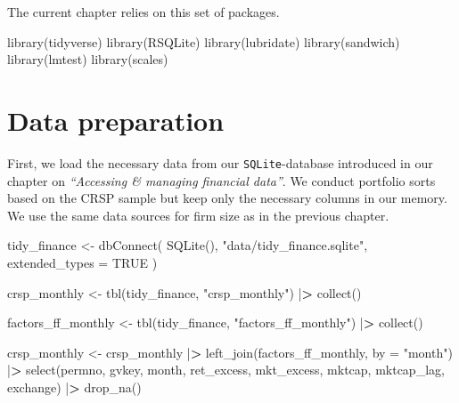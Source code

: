 \documentclass[
]{book}
\newenvironment{Shaded}{\begin{snugshade}}{\end{snugshade}}
\newcommand{\AttributeTok}[1]{\textcolor[rgb]{0.61,0.61,0.61}{#1}}
\newcommand{\ConstantTok}[1]{\textcolor[rgb]{0,0,0}{#1}}
\newcommand{\ErrorTok}[1]{\textcolor[rgb]{0.14,0.14,0.14}{\textbf{#1}}}
\newcommand{\FunctionTok}[1]{\textcolor[rgb]{0,0,0}{#1}}
\newcommand{\NormalTok}[1]{#1}
\newcommand{\OtherTok}[1]{\textcolor[rgb]{0.37,0.37,0.37}{#1}}
\newcommand{\SpecialCharTok}[1]{\textcolor[rgb]{0,0,0}{#1}}
\newcommand{\StringTok}[1]{\textcolor[rgb]{0.5,0.5,0.5}{#1}}
\begin{document}
The current chapter relies on this set of packages.

\begin{Shaded}
\begin{Highlighting}[]
\FunctionTok{library}\NormalTok{(tidyverse)}
\FunctionTok{library}\NormalTok{(RSQLite)}
\FunctionTok{library}\NormalTok{(lubridate)}
\FunctionTok{library}\NormalTok{(sandwich)}
\FunctionTok{library}\NormalTok{(lmtest)}
\FunctionTok{library}\NormalTok{(scales)}
\end{Highlighting}
\end{Shaded}

\hypertarget{data-preparation-2}{%
\section{Data preparation}\label{data-preparation-2}}

First, we load the necessary data from our \texttt{SQLite}-database introduced in our chapter on \emph{``Accessing \& managing financial data''}. We conduct portfolio sorts based on the CRSP sample but keep only the necessary columns in our memory. We use the same data sources for firm size as in the previous chapter.

\begin{Shaded}
\begin{Highlighting}[]
\NormalTok{tidy\_finance }\OtherTok{\textless{}{-}} \FunctionTok{dbConnect}\NormalTok{(}
  \FunctionTok{SQLite}\NormalTok{(), }\StringTok{"data/tidy\_finance.sqlite"}\NormalTok{, }\AttributeTok{extended\_types =} \ConstantTok{TRUE}
\NormalTok{)}

\NormalTok{crsp\_monthly }\OtherTok{\textless{}{-}} \FunctionTok{tbl}\NormalTok{(tidy\_finance, }\StringTok{"crsp\_monthly"}\NormalTok{) }\SpecialCharTok{|}\ErrorTok{\textgreater{}}
  \FunctionTok{collect}\NormalTok{()}

\NormalTok{factors\_ff\_monthly }\OtherTok{\textless{}{-}} \FunctionTok{tbl}\NormalTok{(tidy\_finance, }\StringTok{"factors\_ff\_monthly"}\NormalTok{) }\SpecialCharTok{|}\ErrorTok{\textgreater{}}
  \FunctionTok{collect}\NormalTok{()}

\NormalTok{crsp\_monthly }\OtherTok{\textless{}{-}}\NormalTok{ crsp\_monthly }\SpecialCharTok{|}\ErrorTok{\textgreater{}}
  \FunctionTok{left\_join}\NormalTok{(factors\_ff\_monthly, }\AttributeTok{by =} \StringTok{"month"}\NormalTok{) }\SpecialCharTok{|}\ErrorTok{\textgreater{}}
  \FunctionTok{select}\NormalTok{(permno, gvkey, month, ret\_excess, mkt\_excess, }
\NormalTok{         mktcap, mktcap\_lag, exchange) }\SpecialCharTok{|}\ErrorTok{\textgreater{}}
  \FunctionTok{drop\_na}\NormalTok{()}
\end{Highlighting}
\end{Shaded}
\end{document}

